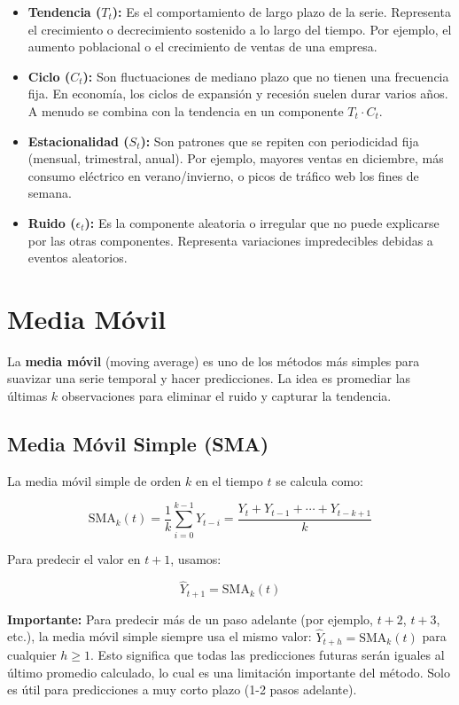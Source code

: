 \documentclass[12pt]{article}
\begin{document}
\begin{itemize}
    \item \textbf{Tendencia ($T_t$):} Es el comportamiento de largo plazo de la serie. Representa el crecimiento o decrecimiento sostenido a lo largo del tiempo. Por ejemplo, el aumento poblacional o el crecimiento de ventas de una empresa.

    \item \textbf{Ciclo ($C_t$):} Son fluctuaciones de mediano plazo que no tienen una frecuencia fija. En economía, los ciclos de expansión y recesión suelen durar varios años. A menudo se combina con la tendencia en un componente $T_t \cdot C_t$.

    \item \textbf{Estacionalidad ($S_t$):} Son patrones que se repiten con periodicidad fija (mensual, trimestral, anual). Por ejemplo, mayores ventas en diciembre, más consumo eléctrico en verano/invierno, o picos de tráfico web los fines de semana.

    \item \textbf{Ruido ($\epsilon_t$):} Es la componente aleatoria o irregular que no puede explicarse por las otras componentes. Representa variaciones impredecibles debidas a eventos aleatorios.
\end{itemize}

\section{Media Móvil}

La \textbf{media móvil} (moving average) es uno de los métodos más simples para suavizar una serie temporal y hacer predicciones. La idea es promediar las últimas $k$ observaciones para eliminar el ruido y capturar la tendencia.

\subsection{Media Móvil Simple (SMA)}

La media móvil simple de orden $k$ en el tiempo $t$ se calcula como:

\[
\text{SMA}_k(t) = \frac{1}{k} \sum_{i=0}^{k-1} Y_{t-i} = \frac{Y_t + Y_{t-1} + \cdots + Y_{t-k+1}}{k}
\]

Para predecir el valor en $t+1$, usamos:

\[
\hat{Y}_{t+1} = \text{SMA}_k(t)
\]

\textbf{Importante:} Para predecir más de un paso adelante (por ejemplo, $t+2$, $t+3$, etc.), la media móvil simple siempre usa el mismo valor: $\hat{Y}_{t+h} = \text{SMA}_k(t)$ para cualquier $h \geq 1$. Esto significa que todas las predicciones futuras serán iguales al último promedio calculado, lo cual es una limitación importante del método. Solo es útil para predicciones a muy corto plazo (1-2 pasos adelante).
\end{document}
